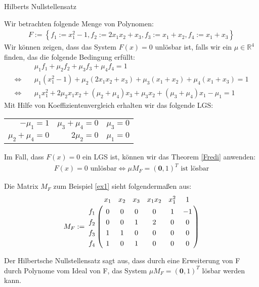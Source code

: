\begin{mslide}{Hilberts Nullstellensatz}
\begin{ex} \label{ex1}
Wir betrachten folgende Menge von Polynomen:
\begin{align*}
F := \left\{f_1 := x_1^2-1, f_2 := 2x_1x_2+x_3,f_3:=x_1+x_2,f_4:=x_1+x_3 \right\}
\end{align*}
Wir können zeigen, dass das System $F(x)=0$ unlösbar ist, falls wir ein $\mu \in \mathbb{R}^4$ finden, das die folgende Bedingung erfüllt:
\begin{align*}
&\mu_1 f_1 + \mu_2 f_2 + \mu_3 f_3 + \mu_4 f_4 = 1 \\
\Leftrightarrow \quad &\mu_1(x_1^2-1)+\mu_2(2x_1x_2+x_3)+\mu_3(x_1+x_2)+\mu_4(x_1+x_3)=1 \\
\Leftrightarrow \quad &\mu_1x_1^2+2\mu_2x_1x_2+(\mu_2+\mu_4)x_3+\mu_3x_2+(\mu_3+\mu_4)x_1-\mu_1 = 1
\end{align*}
Mit Hilfe von Koeffizientenvergleich erhalten wir das folgende LGS:
\begin{table}[h]
\begin{center}
\begin{tabular}{rrr}
$-\mu_1=1$ & $\mu_3+\mu_4=0$ & $\mu_3=0$ \\
$\mu_2+\mu_4=0$ & $2\mu_2=0$ & $\mu_1=0$ 
\end{tabular}
\end{center}
\end{table}
\end{ex}

\framebreak

Im Fall, dass $F(x)=0$ ein LGS ist, können wir das Theorem \ref{Fredi} anwenden: 
\begin{align*}
F(x)=0 \text{ unlösbar} \Leftrightarrow \mu M_F = (\textbf{0},1)^T \text{ ist lösbar}
\end{align*} 

\begin{ex}
Die Matrix $M_F$ zum Beispiel \ref{ex1} sieht folgendermaßen aus: 
\begin{align*}
M_F := \bordermatrix{
	& x_{1} & x_2 & x_3 & x_1x_2 & x_1^2 & 1 \cr
	f_1 & 0 & 0 & 0 & 0 & 1 & -1 \cr
	f_2 & 0 & 0 & 1 & 2 & 0 & 0 \cr
	f_3 & 1 & 1 & 0 & 0 & 0 & 0 \cr
	f_4 & 1 & 0 & 1 & 0 & 0 & 0
}
\end{align*}
\end{ex}

\framebreak

Der Hilbertsche Nullstellensatz sagt aus, dass durch eine Erweiterung von F durch Polynome vom Ideal von F, das System $\mu M_F = (\textbf{0},1)^T$ lösbar werden kann.


\end{mslide}
